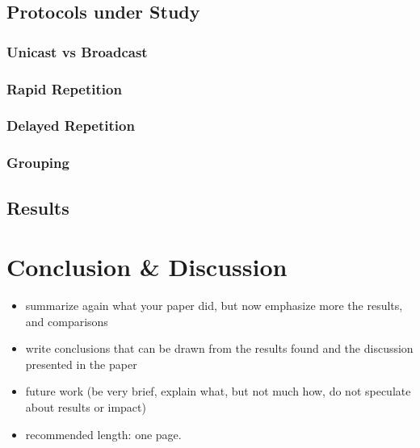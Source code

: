 \documentclass[]{ccs-thesis}
\begin{document}
\section{Protocols under Study}
\subsection*{Unicast vs Broadcast}
\subsection*{Rapid Repetition}
\subsection*{Delayed Repetition}
\subsection*{Grouping}

\section{Results}

\chapter{Conclusion \& Discussion}
\begin{itemize}
\item summarize again what your paper did, but now emphasize more the results, and comparisons
\item write conclusions that can be drawn from the results found and the discussion presented in the paper
\item future work (be very brief, explain what, but not much how, do not speculate about results or impact)
\item recommended length: one page.
\end{itemize}
\end{document}
